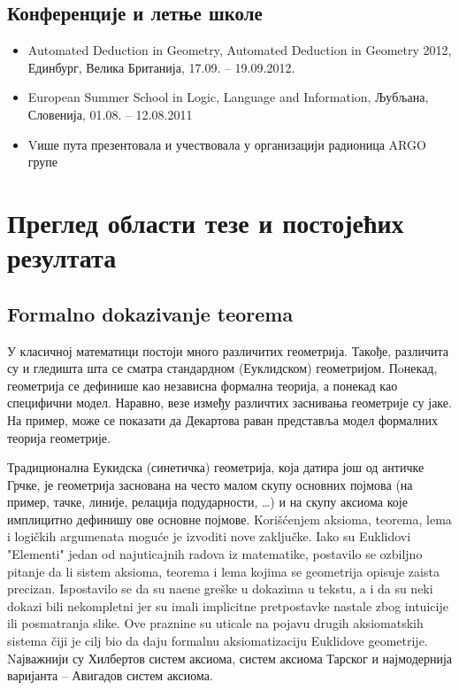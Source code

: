 \documentclass{article}
\begin{document}
\subsection{Конференције и летње школе}
\begin{itemize}
\item {\lat Automated Deduction in Geometry, Automated Deduction in Geometry} 2012, Единбург, Велика Британија, 17.09. -- 19.09.2012.
\item {\lat European Summer School in Logic, Language and Information}, Љубљана, Словенија, 01.08. -- 12.08.2011
\item Vише пута презентовала и учествовала у организацији радионица ARGO групе
\end{itemize}

\section{Преглед области тезе и постојећих резултата}

\subsection{Formalno dokazivanje teorema}

У класичној математици постоји много различитих геометрија. Такође,
различита су и гледишта шта се сматра стандардном (Еуклидском)
геометријом. Пoнекад, геометрија се дефинише као независна формална
теорија, а понекад као специфични модел. Наравно, везе између
различтих заснивања геометрије су јаке. На пример, може се показати да
Декартова раван представља модел формалних теорија геометрије.

Традиционална Еукидска (синетичка) геометрија, која датира још од
античке Грчке, је геометрија заснована на често малом скупу основних
појмова (на пример, тачке, линије, релација подударности, \ldots) и на
скупу аксиома које имплицитно дефинишу ове основне појмове.  Kori\v
s\'cenjem aksioma, teorema, lema i logi\v ckih argumenata mogu\'ce je
izvoditi nove zaklju\v cke. Iako su Euklidovi "Elementi" jedan od
najuticajnih radova iz matematike, postavilo se ozbiljno pitanje da li
sistem aksioma, teorema i lema kojima se geometrija opisuje zaista
precizan. Ispostavilo se da su na\dj ene gre\v ske u dokazima u tekstu,
a i da su neki dokazi bili nekompletni jer su imali implicitne
pretpostavke nastale zbog intuicije ili posmatranja slike. Ove
praznine su uticale na pojavu drugih aksioma{t}{s}kih sistema \v ciji je
cilj bio da daju formalnu aksiomatizaciju Euklidove
geometrije. Nајважнији су Хилбертов систем аксиома, систем аксиома
Тарског и најмодернија варијанта -- Авигадов систем аксиома.
\end{document}

